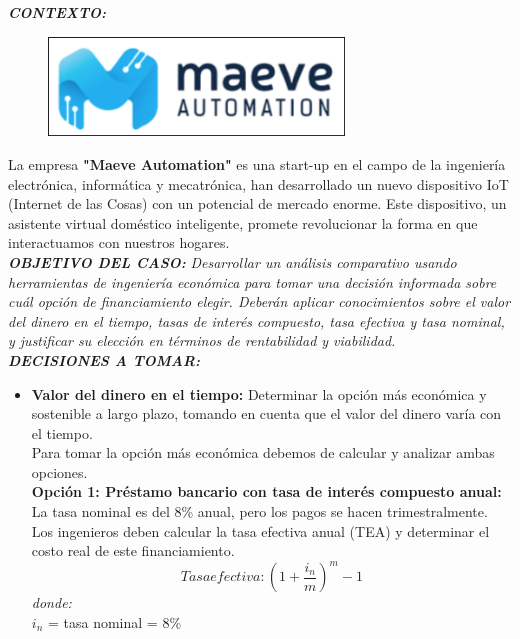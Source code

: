 \documentclass[letterpaper,12pt]{article}
\begin{document}
\begin{sloppypar}
\textbf{\textit{CONTEXTO:}}
\begin{figure}[H]
    \centering 
    \includegraphics[width=0.7\textwidth]{maeve.png}
\end{figure}
La empresa \textbf{"Maeve Automation"} es una start-up en el campo de la ingeniería electrónica, informática y mecatrónica, han desarrollado un nuevo dispositivo IoT (Internet de las Cosas) con un potencial de mercado enorme. Este dispositivo, un asistente virtual doméstico inteligente, promete revolucionar la forma en que interactuamos con nuestros hogares. 
\vspace{0.3cm}\\ 
\textbf{\textit{OBJETIVO DEL CASO:}}
\textit{Desarrollar un análisis comparativo usando herramientas de ingeniería económica para tomar una decisión informada sobre cuál opción de financiamiento elegir. Deberán aplicar conocimientos sobre el valor del dinero en el tiempo, tasas de interés compuesto, tasa efectiva y tasa nominal, y justificar su elección en términos de rentabilidad y viabilidad. }
\vspace{0.3cm}\\ 
\textbf{\textit{DECISIONES A TOMAR:}}
\begin{itemize}
    \item \textbf{Valor del dinero en el tiempo:} Determinar la opción más económica y sostenible a largo plazo, tomando en cuenta que el valor del dinero varía con el tiempo.
    \vspace{0.3cm}\\ 
    Para tomar la opción más económica debemos de calcular y analizar ambas opciones.
    \vspace{0.3cm}\\ 
    \textbf{Opción 1: Préstamo bancario con tasa de interés compuesto anual:} La tasa nominal es del 8\% anual, pero los pagos se hacen trimestralmente. Los ingenieros deben calcular la tasa efectiva anual (TEA) y determinar el costo real de este financiamiento.
    $$Tasa efectiva: \left(1+\frac{i_n}{m}\right) ^{m} - 1$$
    \textit{donde:}\\ 
    $i_n$ = tasa nominal = 8\%\\ 

\end{itemize}
\end{sloppypar}
\end{document}
